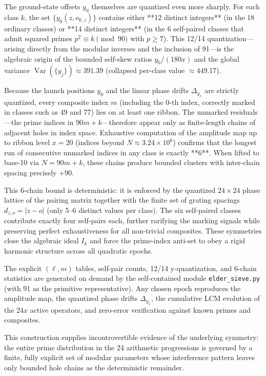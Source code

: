 \documentclass[11pt,a4paper]{article}
\begin{document}
The ground-state offsets \(y_0\) themselves are quantized even more sharply. For each class \(k\), the set \(\{y_0(z,o_{k,z})\}\) contains either **12 distinct integers** (in the 18 ordinary classes) or **14 distinct integers** (in the 6 self-paired classes that admit squared primes \(p^2 \equiv k \pmod{90}\) with \(p \geq 7\)). This 12/14 quantization—arising directly from the modular inverses and the inclusion of 91—is the algebraic origin of the bounded self-skew ratios \(y_0/(180x)\) and the global variance \(\operatorname{Var}(\{y_j\}) \approx 391.39\) (collapsed per-class value \(\approx 449.17\)).

Because the launch positions \(y_0\) and the linear phase drifts \(\Delta_{y_x}\) are strictly quantized, every composite index \(m\) (including the 0-th index, correctly marked in classes such as 49 and 77) lies on at least one ribbon. The unmarked residuals—the prime indices in \(90m + k\)—therefore appear only as finite-length chains of adjacent holes in index space. Exhaustive computation of the amplitude map up to ribbon level \(x=20\) (indices beyond \(N \approx 3.24 \times 10^6\)) confirms that the longest run of consecutive unmarked indices in any class is exactly **6**. When lifted to base-10 via \(N = 90m + k\), these chains produce bounded clusters with inter-chain spacing precisely \(+90\).

This 6-chain bound is deterministic: it is enforced by the quantized \(24 \times 24\) phase lattice of the pairing matrix together with the finite set of grating spacings \(d_{z,o} = |z-o|\) (only 5--6 distinct values per class). The six self-paired classes contribute exactly four self-pairs each, further rarifying the marking signals while preserving perfect exhaustiveness for all non-trivial composites. These symmetries close the algebraic ideal \(I_k\) and force the prime-index anti-set to obey a rigid harmonic structure across all quadratic epochs.

The explicit \((\ell, m)\) tables, self-pair counts, 12/14 y-quantization, and 6-chain statistics are generated on demand by the self-contained module \texttt{elder\_sieve.py} (with 91 as the primitive representative). Any chosen epoch reproduces the amplitude map, the quantized phase drifts \(\Delta_{y_x}\), the cumulative LCM evolution of the \(24x\) active operators, and zero-error verification against known primes and composites.

This construction supplies incontrovertible evidence of the underlying symmetry: the entire prime distribution in the 24 arithmetic progressions is governed by a finite, fully explicit set of modular parameters whose interference pattern leaves only bounded hole chains as the deterministic remainder.
\end{document}
